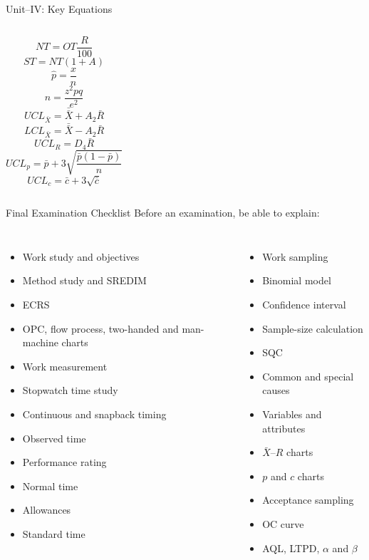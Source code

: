 \documentclass[aspectratio=169,10pt]{beamer}
\begin{document}

\begin{frame}{Unit--IV: Key Equations}
\small
\begin{columns}[T,onlytextwidth]
\[
\boxed{NT=OT\frac{R}{100}}
\]
\[
\boxed{ST=NT(1+A)}
\]
\[
\boxed{\hat p=\frac{x}{n}}
\]
\[
\boxed{n=\frac{z^2pq}{e^2}}
\]
\[
\boxed{UCL_{\bar X}=\bar{\bar X}+A_2\bar R}
\]
\[
\boxed{LCL_{\bar X}=\bar{\bar X}-A_2\bar R}
\]
\[
\boxed{UCL_R=D_4\bar R}
\]
\[
\boxed{UCL_p=\bar p+3\sqrt{\frac{\bar p(1-\bar p)}{n}}}
\]
\[
\boxed{UCL_c=\bar c+3\sqrt{\bar c}}
\]
\end{columns}
\end{frame}


\begin{frame}{Final Examination Checklist}
\footnotesize
Before an examination, be able to explain:
\begin{columns}[T,onlytextwidth]
\begin{itemize}
\item Work study and objectives
\item Method study and SREDIM
\item ECRS
\item OPC, flow process, two-handed and man-machine charts
\item Work measurement
\item Stopwatch time study
\item Continuous and snapback timing
\item Observed time
\item Performance rating
\item Normal time
\item Allowances
\item Standard time
\end{itemize}
\begin{itemize}
\item Work sampling
\item Binomial model
\item Confidence interval
\item Sample-size calculation
\item SQC
\item Common and special causes
\item Variables and attributes
\item $\bar X$--$R$ charts
\item $p$ and $c$ charts
\item Acceptance sampling
\item OC curve
\item AQL, LTPD, $\alpha$ and $\beta$
\end{itemize}
\end{columns}
\end{frame}
\end{document}
